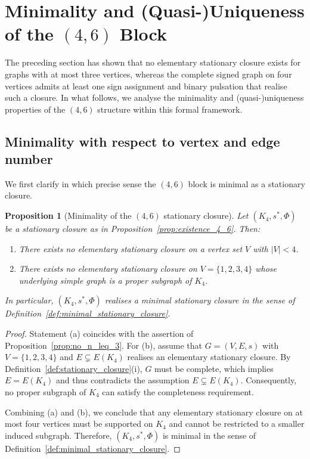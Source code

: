 \documentclass[11pt,a4paper]{article}
\newtheorem{proposition}[theorem]{Proposition}
\theoremstyle{definition}
\begin{document}
\section{Minimality and (Quasi-)Uniqueness of the \texorpdfstring{$(4,6)$}{(4,6)} Block}
\label{sec:four_six_block}

The preceding section has shown that no elementary stationary closure exists for graphs with at most three vertices, whereas the complete signed graph on four vertices admits at least one sign assignment and binary pulsation that realise such a closure.\cite{PDL_Main_2026,PDL_Intro_2026} In what follows, we analyse the minimality and (quasi-)uniqueness properties of the $(4,6)$ structure within this formal framework.

\subsection{Minimality with respect to vertex and edge number}

We first clarify in which precise sense the $(4,6)$ block is minimal as a stationary closure.

\begin{proposition}[Minimality of the $(4,6)$ stationary closure]
\label{prop:minimality_4_6}
Let $(K_4,s^\ast,\Phi)$ be a stationary closure as in Proposition~\ref{prop:existence_4_6}. Then:
\begin{enumerate}
  \item[(a)] There exists no elementary stationary closure on a vertex set $V$ with $|V|<4$.
  \item[(b)] There exists no elementary stationary closure on $V=\{1,2,3,4\}$ whose underlying simple graph is a proper subgraph of $K_4$.
\end{enumerate}
In particular, $(K_4,s^\ast,\Phi)$ realises a minimal stationary closure in the sense of Definition~\ref{def:minimal_stationary_closure}.
\end{proposition}

\begin{proof}
Statement (a) coincides with the assertion of Proposition~\ref{prop:no_n_leq_3}. For (b), assume that $G=(V,E,s)$ with $V=\{1,2,3,4\}$ and $E\subsetneq E(K_4)$ realises an elementary stationary closure. By Definition~\ref{def:stationary_closure}(i), $G$ must be complete, which implies $E=E(K_4)$ and thus contradicts the assumption $E\subsetneq E(K_4)$. Consequently, no proper subgraph of $K_4$ can satisfy the completeness requirement.

Combining (a) and (b), we conclude that any elementary stationary closure on at most four vertices must be supported on $K_4$ and cannot be restricted to a smaller induced subgraph. Therefore, $(K_4,s^\ast,\Phi)$ is minimal in the sense of Definition~\ref{def:minimal_stationary_closure}.
\end{proof}
\end{document}
